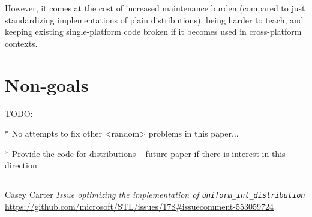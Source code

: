\documentclass{wg21}
\begin{document}
However, it comes at the cost of increased maintenance burden (compared
to just standardizing implementations of plain distributions), being
harder to teach, and keeping existing single-platform code broken if it
becomes used in cross-platform contexts.



\hypertarget{non-goals}{%
    \section{Non-goals}\label{non-goals}}

TODO:

* No attempts to fix other <random> problems in this paper...

* Provide the code for distributions -- future paper if there is interest in this direction

\vskip1cm
\hrule

\begin{thebibliography}{9}
	
    Casey Carter
    \emph{Issue optimizing the implementation of \texttt{uniform_int_distribution}}
    \url{https://github.com/microsoft/STL/issues/178#issuecomment-553059724}
    	
\end{thebibliography}
\end{document}
